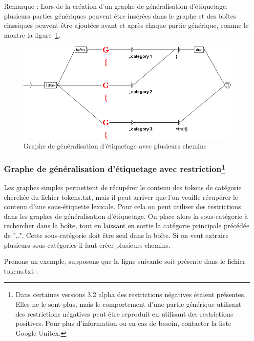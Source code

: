 \bigskip
Remarque : Lors de la création d'un graphe de généralisation d'étiquetage, plusieurs parties génériques peuvent être insérées dans le graphe et des boîtes classiques peuvent être ajoutées avant et après chaque partie générique, comme le montre la figure~\ref{fig:graphe_generique_plusieurs_chemins}.

\begin{figure}[!htb]
  \centering
  \includegraphics[width=14cm]{resources/img/graphe_generique_plusieurs_chemins.png}
  \caption{Graphe de généralisation d'étiquetage avec plusieurs chemins}
  \label{fig:graphe_generique_plusieurs_chemins}
\end{figure}

\subsubsection{Graphe de généralisation d'étiquetage avec restriction\protect\footnote{Dans certaines versions 3.2 alpha des restrictions négatives étaient présentes. Elles ne le sont plus, mais le comportement d'une partie générique utilisant des restrictions négatives peut être reproduit en utilisant des restrictions positives. Pour plus d'information ou en cas de besoin, contacter la liste Google Unitex.}}

Les graphes simples permettent de récupérer le contenu des tokens de catégorie cherchée du fichier tokens.txt, mais il peut arriver que l'on veuille récupérer le contenu d'une sous-étiquette lexicale. Pour cela on peut utiliser des restrictions dans les graphes de généralisation d'étiquetage. On place alors la sous-catégorie à rechercher dans la boîte, tout en laissant en sortie la catégorie principale précédée de ",.". Cette sous-catégorie doit être seul dans la boîte. Si on veut extraire plusieurs sous-catégories il faut créer plusieurs chemins.


\bigskip
Prenons un exemple, supposons que la ligne suivante soit présente dans le fichier tokens.txt :


